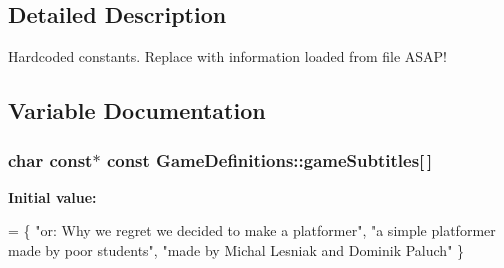 \subsection{Detailed Description}
Hardcoded constants. Replace with information loaded from file A\+S\+A\+P! 

\subsection{Variable Documentation}
\subsubsection[{\texorpdfstring{game\+Subtitles}{gameSubtitles}}]{\setlength{\rightskip}{0pt plus 5cm}char const$\ast$ const Game\+Definitions\+::game\+Subtitles\mbox{[}$\,$\mbox{]}}\hypertarget{namespace_game_definitions_a025765ef86b49fd2e8216a5ec5226eaf}{}\label{namespace_game_definitions_a025765ef86b49fd2e8216a5ec5226eaf}
{\bfseries Initial value\+:}
\begin{DoxyCode}
=
    \{ \textcolor{stringliteral}{"or: Why we regret we decided to make a platformer"},
        \textcolor{stringliteral}{"a simple platformer made by poor students"},
        \textcolor{stringliteral}{"made by Michal Lesniak and Dominik Paluch"} \}
\end{DoxyCode}
